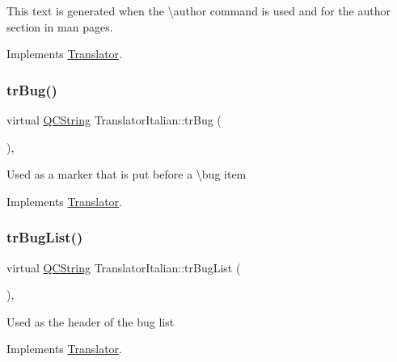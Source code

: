This text is generated when the \textbackslash{}author command is used and for the author section in man pages. 

Implements \mbox{\hyperlink{class_translator}{Translator}}.

\mbox{\label{class_translator_italian_ab2283ed706ea31ed9ba1ee7f8ea64c18}} 
\subsubsection{\texorpdfstring{trBug()}{trBug()}}
{\footnotesize\ttfamily virtual \mbox{\hyperlink{class_q_c_string}{Q\+C\+String}} Translator\+Italian\+::tr\+Bug (\begin{DoxyParamCaption}{ }\end{DoxyParamCaption})\hspace{0.3cm}{\ttfamily [inline]}, {\ttfamily [virtual]}}

Used as a marker that is put before a \textbackslash{}bug item 

Implements \mbox{\hyperlink{class_translator}{Translator}}.

\mbox{\label{class_translator_italian_a3a0c0ea29db7016556e5dc167e3c1c28}} 
\subsubsection{\texorpdfstring{trBugList()}{trBugList()}}
{\footnotesize\ttfamily virtual \mbox{\hyperlink{class_q_c_string}{Q\+C\+String}} Translator\+Italian\+::tr\+Bug\+List (\begin{DoxyParamCaption}{ }\end{DoxyParamCaption})\hspace{0.3cm}{\ttfamily [inline]}, {\ttfamily [virtual]}}

Used as the header of the bug list 

Implements \mbox{\hyperlink{class_translator}{Translator}}.

\mbox{\label{class_translator_italian_aa203560a69ac79dea8736cc4b77e217d}} 

